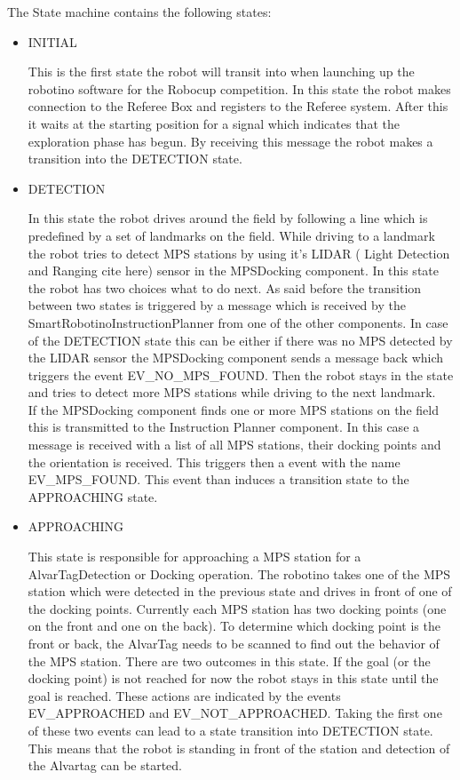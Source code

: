 \newpage


The State machine contains the following states:

\begin{itemize}

\item INITIAL 

This is the first state the robot will transit into when launching up the robotino software for the Robocup competition. In this state the robot makes connection to the Referee Box and registers to the Referee system. After this it waits at the starting position for a signal which indicates that the exploration phase has begun. By receiving this message the robot makes a transition into the DETECTION state.  


\item DETECTION

In this state the robot drives around the field by following a line which is predefined by a set of landmarks on the field. While driving to a landmark the robot tries to detect MPS stations by using it's LIDAR ( Light Detection and Ranging cite here) sensor in the MPSDocking component. In this state the robot has two choices what to do next. As said before the transition between two states is triggered by a message which is received by the SmartRobotinoInstructionPlanner from one of the other components. In case of the DETECTION state this can be either if there was no MPS detected by the LIDAR sensor the MPSDocking component sends a message back which triggers the event EV\_NO\_MPS\_FOUND. Then the robot stays in the state and tries to detect more MPS stations while driving to the next landmark.  \\

If the MPSDocking component finds one or more MPS stations on the field this is transmitted to the Instruction Planner component. In this case a message is received with a list of all MPS stations, their docking points and the orientation is received. This triggers then a event with the name EV\_MPS\_FOUND. This event than induces a transition state to the APPROACHING state. 

\item APPROACHING 

This state is responsible for approaching a MPS station for a AlvarTagDetection or Docking operation. The robotino takes one of the MPS station which were detected in the previous state and drives in front of one of the docking points. Currently each MPS station has two docking points (one on the front and one on the back). To determine which docking point is the front or back, the AlvarTag needs to be scanned to find out the behavior of the MPS station. There are two outcomes in this state. If the goal (or the docking point) is not reached for now the robot stays in this state until the goal is reached. These actions are indicated by the events EV\_APPROACHED and EV\_NOT\_APPROACHED. Taking the first one of these two events can lead to a state transition into DETECTION state. This means that the robot is standing in front of the station and detection of the Alvartag can be started. 



\end{itemize}
